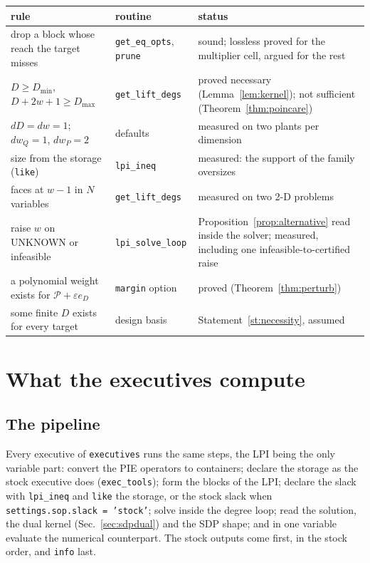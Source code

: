 \documentclass[12pt]{article}
\newcommand{\mcl}[1]{\mathcal{#1}}
\newcommand{\code}[1]{\texttt{#1}}
\theoremstyle{plain}
\theoremstyle{definition}
\theoremstyle{remark}
\begin{document}
\begin{center}\footnotesize
\begin{tabular}{p{5.2cm} p{3.6cm} p{6.4cm}}
\toprule
rule & routine & status \\
\midrule
drop a block whose reach the target misses & \code{get\_eq\_opts}, \code{prune} & sound; lossless proved for the multiplier cell, argued for the rest \\
$D\ge D_{\min}$, $D+2w+1\ge D_{\max}$ & \code{get\_lift\_degs} & proved necessary (Lemma~\ref{lem:kernel}); not sufficient (Theorem~\ref{thm:poincare}) \\
$dD=dw=1$; $dw_Q=1$, $dw_P=2$ & defaults & measured on two plants per dimension \\
size from the storage (\code{like}) & \code{lpi\_ineq} & measured: the support of the family oversizes \\
faces at $w-1$ in $N$ variables & \code{get\_lift\_degs} & measured on two 2-D problems \\
raise $w$ on UNKNOWN or infeasible & \code{lpi\_solve\_loop} & Proposition~\ref{prop:alternative} read inside the solver; measured, including one infeasible-to-certified raise \\
a polynomial weight exists for $\mcl P+\varepsilon e_D$ & \code{margin} option & proved (Theorem~\ref{thm:perturb}) \\
some finite $D$ exists for every target & design basis & Statement~\ref{st:necessity}, assumed \\
\bottomrule
\end{tabular}
\end{center}

\section{What the executives compute}\label{sec:executives}

\subsection{The pipeline}

Every executive of \code{executives} runs the same steps, the LPI being the only variable part: convert the PIE operators to containers; declare the storage as the stock executive does (\code{exec\_tools}); form the blocks of the LPI; declare the slack with \code{lpi\_ineq} and \code{like} the storage, or the stock slack when \code{settings.sop.slack = 'stock'}; solve inside the degree loop; read the solution, the dual kernel (Sec.~\ref{sec:sdpdual}) and the SDP shape; and in one variable evaluate the numerical counterpart. The stock outputs come first, in the stock order, and \code{info} last.
\end{document}
